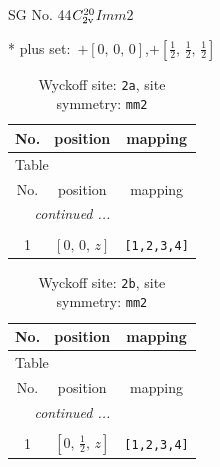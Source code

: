 \documentclass[fleqn,8pt]{jsarticle}
\begin{document}
\setcounter{MaxMatrixCols}{32}

\renewcommand{\tablename}{Table~}
\renewcommand{\figurename}{Figure~}
\begin{center}
\LARGE
SG No. 44\quad$C_{\rm 2v}^{20}$\quad$Imm2$\quad[ orthorhombic ]
\end{center}
* plus set:\,\,\,$+\left[ 0,\, 0,\, 0 \right]$,\quad $+\left[ \frac{1}{2},\, \frac{1}{2},\, \frac{1}{2} \right]$
\renewcommand{\arraystretch}{1.2}
\begin{longtable}{ccc}
\caption{Wyckoff site: {\tt 2a}, site symmetry: {\tt mm2}}
 \\
 \hline \hline
No. & position & mapping \\ \hline \endfirsthead

\multicolumn{2}{l}{\tablename\ \thetable{}} \\
 \hline \hline
No. & position & mapping \\ \hline \endhead

 \hline \hline
\multicolumn{2}{r}{\footnotesize\it continued ...} \\ \endfoot

 \hline \hline
\multicolumn{2}{r}{} \\ \endlastfoot

1 & $\left[ 0,\, 0,\, z \right]$ & {\tt [1,2,3,4]} \\
\end{longtable}
\renewcommand{\arraystretch}{1.2}
\begin{longtable}{ccc}
\caption{Wyckoff site: {\tt 2b}, site symmetry: {\tt mm2}}
 \\
 \hline \hline
No. & position & mapping \\ \hline \endfirsthead

\multicolumn{2}{l}{\tablename\ \thetable{}} \\
 \hline \hline
No. & position & mapping \\ \hline \endhead

 \hline \hline
\multicolumn{2}{r}{\footnotesize\it continued ...} \\ \endfoot

 \hline \hline
\multicolumn{2}{r}{} \\ \endlastfoot

1 & $\left[ 0,\, \frac{1}{2},\, z \right]$ & {\tt [1,2,3,4]} \\
\end{longtable}
\renewcommand{\arraystretch}{1.2}
\end{document}
